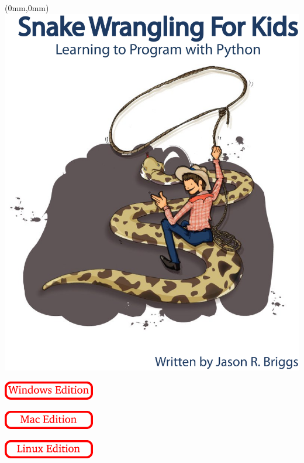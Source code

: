 \pagestyle{empty}
\frontmatter
\begin{FRONTCOVER}
\begin{titlepage}
\begin{textblock*}{210mm}(0mm,0mm)
   \includegraphics[width=0.9\paperwidth]{eps/cover.eps}
\end{textblock*}
\begin{flushright}
\begin{WINDOWS}
\includegraphics[width=40mm]{eps/windows-edition.eps} 
\end{WINDOWS}
\begin{MAC}
\includegraphics[width=40mm]{eps/mac-edition.eps} 
\end{MAC}
\begin{LINUX}
\includegraphics[width=40mm]{eps/linux-edition.eps} 
\end{LINUX}
\end{flushright}
\end{titlepage}
\end{FRONTCOVER}

